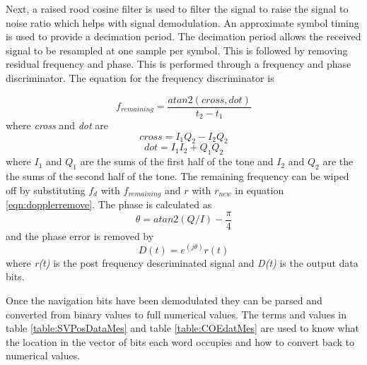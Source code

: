 \documentclass[12pt]{report}
\begin{document}
Next, a raised rood cosine filter is used to filter the signal to raise the signal to noise ratio which helps with signal demodulation. An approximate symbol timing is used to provide a decimation period. The decimation period allows the received signal to be resampled at one sample per symbol. This is followed by removing residual frequency and phase. This is performed through a frequency and phase discriminator. The equation for the frequency discriminator is 

\begin{equation}
    f_{remaining} = \frac{atan2(cross,dot)}{t_2 - t_1}
    \label{eqn:freqdisc}
\end{equation}
where \textit{cross} and \textit{dot} are 
\begin{equation}
    cross = I_1Q_2 - I_2Q_2
\end{equation}
\begin{equation}
    dot = I_1I_2 + Q_1Q_2
\end{equation}
where $I_1$ and $Q_1$ are the sums of the first half of the tone and $I_2$ and $Q_2$ are the the sums of the second half of the tone. The remaining frequency can be wiped off by substituting $f_d$ with $f_{remaining}$ and $r$ with $r_{new}$ in equation \ref{eqn:dopplerremove}. The phase is calculated as 
\begin{equation}
    \theta = atan2(Q/I)-\frac{\pi}{4}
\end{equation}
and the phase error is removed by 
\begin{equation}
    D(t) = e^(j\theta)r(t)
\end{equation}
where \textit{r(t)} is the post frequency descriminated signal and \textit{D(t)} is the output data bits.


Once the navigation bits have been demodulated they can be parsed and converted from binary values to full numerical values. The terms and values in table \ref{table:SVPosDataMes} and table \ref{table:COEdatMes} are used to know what the location in the vector of bits each word occupies and how to convert back to numerical values. 
\end{document}
